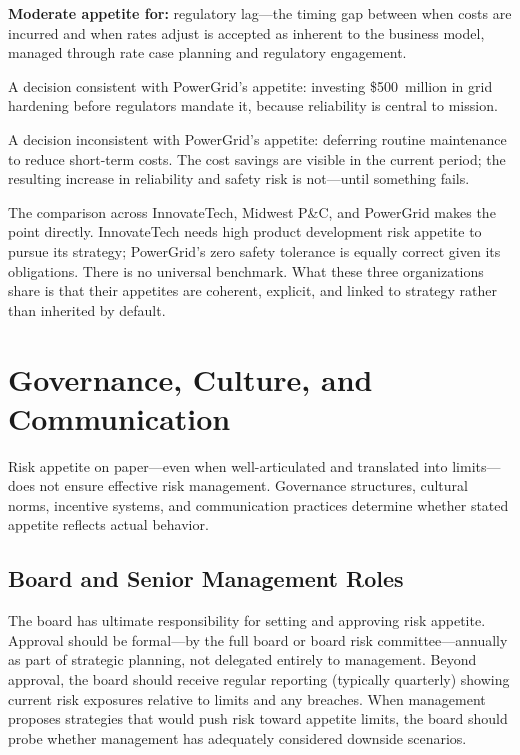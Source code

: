 \documentclass[11pt,openany]{book}
\begin{document}
\textbf{Moderate appetite for:} regulatory lag---the timing gap between when
costs are incurred and when rates adjust is accepted as inherent to the business
model, managed through rate case planning and regulatory engagement.

A decision consistent with PowerGrid's appetite: investing \$500~million in grid
hardening before regulators mandate it, because reliability is central to mission.

A decision inconsistent with PowerGrid's appetite: deferring routine maintenance
to reduce short-term costs. The cost savings are visible in the current period;
the resulting increase in reliability and safety risk is not---until something
fails.

The comparison across InnovateTech, Midwest P\&C, and PowerGrid makes the
point directly. InnovateTech needs high product development risk appetite to
pursue its strategy; PowerGrid's zero safety tolerance is equally correct given
its obligations. There is no universal benchmark. What these three organizations
share is that their appetites are coherent, explicit, and linked to strategy
rather than inherited by default.

\section{Governance, Culture, and Communication}
\label{sec:governance-culture}

Risk appetite on paper---even when well-articulated and translated into limits---
does not ensure effective risk management. Governance structures, cultural norms,
incentive systems, and communication practices determine whether stated appetite
reflects actual behavior.

\subsection{Board and Senior Management Roles}
\label{subsec:board-management-roles}

The board has ultimate responsibility for setting and approving risk appetite.
Approval should be formal---by the full board or board risk committee---annually
as part of strategic planning, not delegated entirely to management. Beyond
approval, the board should receive regular reporting (typically quarterly) showing
current risk exposures relative to limits and any breaches. When management
proposes strategies that would push risk toward appetite limits, the board should
probe whether management has adequately considered downside scenarios.
\end{document}
